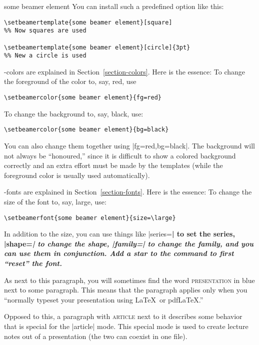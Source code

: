 \begin{element}{some beamer element}
  You can install such a predefined option like this:
\begin{verbatim}
\setbeamertemplate{some beamer element}[square]
%% Now squares are used

\setbeamertemplate{some beamer element}[circle]{3pt}
%% New a circle is used
\end{verbatim}

  \beamer-colors are explained in Section~\ref{section-colors}. Here is the essence: To change the foreground of the color to, say, red, use
\begin{verbatim}
\setbeamercolor{some beamer element}{fg=red}
\end{verbatim}

  To change the background to, say, black, use:
\begin{verbatim}
\setbeamercolor{some beamer element}{bg=black}
\end{verbatim}

  You can also change them together using |fg=red,bg=black|. The background will not always be ``honoured,'' since it is difficult to show a colored background correctly and an extra effort must be made by the templates (while the foreground color is usually used automatically).

  \beamer-fonts are explained in Section~\ref{section-fonts}. Here is the essence: To change the size of the font to, say, large, use:
\begin{verbatim}
\setbeamerfont{some beamer element}{size=\large}
\end{verbatim}

  In addition to the size, you can use things like |series=\bfseries| to set the series, |shape=\itshape| to change the shape, |family=\sffamily| to change the family, and you can use them in conjunction. Add a star to the command to first ``reset'' the font.
\end{element}

\beamernote
As next to this paragraph, you will sometimes find the word \textsc{presentation} in blue next to some paragraph. This means that the paragraph applies only when you ``normally typeset your presentation using \LaTeX\ or pdf\LaTeX.''

\articlenote
Opposed to this, a paragraph with \textsc{article} next to it describes some behavior that is special for the |article| mode. This special mode is used to create lecture notes out of a presentation (the two can coexist in one file).

\endgroup


